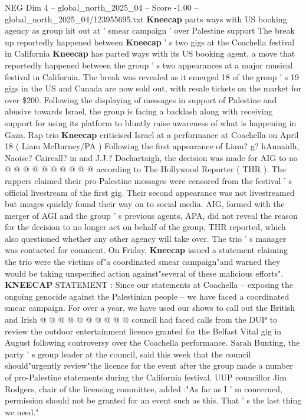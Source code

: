 \begin{textsample}{NEG Dim 4 – global\_north\_2025\_04 – Score -1.00 – global\_north\_2025\_04/123955695.txt}  \label{ex:f4_neg_231}
\textbf{Kneecap} parts ways with US booking agency as group hit out at ' smear campaign ' over Palestine support The break up reportedly happened between \textbf{Kneecap} ' s two gigs at the Coachella festival in California \textbf{Kneecap} has parted ways with its US booking agent, a move that reportedly happened between the group ' s two appearances at a major musical festival in California.
The break was revealed as it emerged 18 of the group ' s 19 gigs in the US and Canada are now sold out, with resale tickets on the market for over \$200.
Following the displaying of messages in support of Palestine and abusive towards Israel, the group is facing a backlash along with receiving support for using its platform to bluntly raise awareness of what is happening in Gaza.
Rap trio \textbf{Kneecap} criticised Israel at a performance at Coachella on April 18 ( Liam McBurney/PA ) Following the first appearance of Liam? g? hAnnaidh, Naoise?
Caireall? in and J.J.?
Dochartaigh, the decision was made for AIG to no @ @ @ @ @ @ @ @ @ @ according to The Hollywood Reporter ( THR ).
The rappers claimed their pro-Palestine messages were censored from the festival ' s official livestream of the first gig.
Their second appearance was not livestreamed but images quickly found their way on to social media.
AIG, formed with the merger of AGI and the group ' s previous agents, APA, did not reveal the reason for the decision to no longer act on behalf of the group, THR reported, which also questioned whether any other agency will take over.
The trio ' s manager was contacted for comment.
On Friday, \textbf{Kneecap} issued a statement claiming the trio were the victims of"a coordinated smear campaign"and warned they would be taking unspecified action against"several of these malicious efforts". \textbf{KNEECAP} STATEMENT : Since our statements at Coachella -- exposing the ongoing genocide against the Palestinian people -- we have faced a coordinated smear campaign.
For over a year, we have used our shows to call out the British and Irish @ @ @ @ @ @ @ @ @ @ council had faced calls from the DUP to review the outdoor entertainment licence granted for the Belfast Vital gig in August following controversy over the Coachella performance.
Sarah Bunting, the party ' s group leader at the council, said this week that the council should"urgently review"the licence for the event after the group made a number of pro-Palestine statements during the California festival.
UUP councillor Jim Rodgers, chair of the licensing committee, added :"As far as I ' m concerned, permission should not be granted for an event such as this.
That ' s the last thing we need."

\end{textsample}
